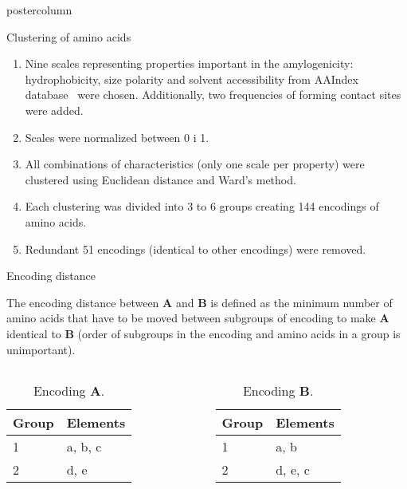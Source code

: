 \documentclass[final]{beamer}\usepackage[]{graphicx}\usepackage[]{color}
\begin{document}
\begin{frame}
\begin{columns}
\begin{column}{.49\textwidth}
\begin{beamercolorbox}[center,wd=\textwidth]{postercolumn}
\begin{minipage}[T]{.95\textwidth}
{\begin{block}{Clustering of amino acids}
\begin{enumerate}[1.]
\item Nine scales representing properties important in the amylogenicity: hydrophobicity, size polarity and solvent accessibility from AAIndex database~\citep{kawashima_aaindex:_2008} were chosen. Additionally, two frequencies of forming contact sites~\citep{wozniak_characteristics_2014} were added.
\item Scales were normalized between 0 i 1.
\item All combinations of characteristics (only one scale per property) were clustered using Euclidean distance and Ward's method.
\item Each clustering was divided into 3 to 6 groups creating 144 encodings of amino acids.
\item Redundant 51 encodings (identical to other encodings) were removed.
\end{enumerate}

\end{block}
\vfill


\begin{block}{Encoding distance}

The encoding distance between \textbf{A} and \textbf{B} is defined as the minimum number of amino acids that have to be moved between subgroups of encoding to make \textbf{A} identical to \textbf{B} (order of subgroups in the encoding and amino acids in a group is unimportant).

\begin{columns}
\begin{table}[ht]
\centering
\begin{tabular}{ll}
  \hline
Group & Elements \\ 
  \hline
1 & a, b, c \\ 
  2 & d, e \\ 
   \hline
\end{tabular}
\caption{Encoding \textbf{A}.} 
\end{table}


\begin{table}[ht]
\centering
\begin{tabular}{ll}
  \hline
Group & Elements \\ 
  \hline
1 & a, b \\ 
  2 & d, e, c \\ 
   \hline
\end{tabular}
\caption{Encoding \textbf{B}.} 
\end{table}


\end{columns}
\end{block}}
\end{minipage}
\end{beamercolorbox}
\end{column}
\end{columns}
\end{frame}
\end{document}
